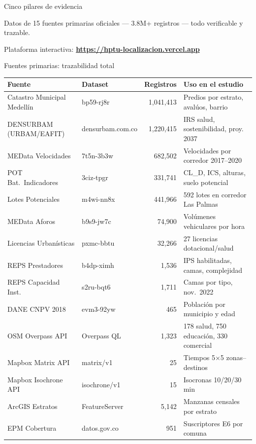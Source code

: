 \documentclass[aspectratio=169, 11pt]{beamer}
\begin{document}
{\begin{frame}{Cinco pilares de evidencia}
\vspace{14pt}
\begin{center}
{\small\textcolor{slate}{Datos de 15 fuentes primarias oficiales — 3.8M+ registros — todo verificable y trazable.}}

\vspace{6pt}
{\small Plataforma interactiva: \textcolor{hptu}{\textbf{\url{https://hptu-localizacion.vercel.app}}}}
\end{center}
\end{frame}
}

\begin{frame}{Fuentes primarias: trazabilidad total}

\vspace{2pt}
{\footnotesize
\begin{tabular}{@{}p{4.5cm}lrp{5.5cm}@{}}
\toprule
\textbf{Fuente} & \textbf{Dataset} & \textbf{Registros} & \textbf{Uso en el estudio} \\
\midrule
Catastro Municipal Medellín & bp59-rj8r & 1,041,413 & Predios por estrato, avalúos, barrio \\
DENSURBAM (URBAM/EAFIT) & densurbam.com.co & 1,220,415 & IRS salud, sostenibilidad, proy. 2037 \\
MEData Velocidades & 7t5n-3b3w & 682,502 & Velocidades por corredor 2017--2020 \\
POT Bat.\ Indicadores & 3ciz-tpgr & 331,741 & CL\_D, ICS, alturas, suelo potencial \\
Lotes Potenciales & m4wi-nn8x & 441,966 & 592 lotes en corredor Las Palmas \\
MEData Aforos & b9s9-jw7c & 74,900 & Volúmenes vehiculares por hora \\
Licencias Urbanísticas & pxmc-bbtu & 32,266 & 27 licencias dotacional/salud \\
REPS Prestadores & b4dp-ximh & 1,536 & IPS habilitadas, camas, complejidad \\
REPS Capacidad Inst.\ & s2ru-bqt6 & 1,711 & Camas por tipo, nov.\ 2022 \\
DANE CNPV 2018 & evm3-92yw & 465 & Población por municipio y edad \\
OSM Overpass API & Overpass QL & 1,323 & 178 salud, 750 educación, 330 comercial \\
Mapbox Matrix API & matrix/v1 & 25 & Tiempos 5×5 zonas--destinos \\
Mapbox Isochrone API & isochrone/v1 & 15 & Isocronas 10/20/30 min \\
ArcGIS Estratos & FeatureServer & 5,142 & Manzanas censales por estrato \\
EPM Cobertura & datos.gov.co & 951 & Suscriptores E6 por comuna \\
\bottomrule
\end{tabular}
}


\end{frame}
\end{document}
